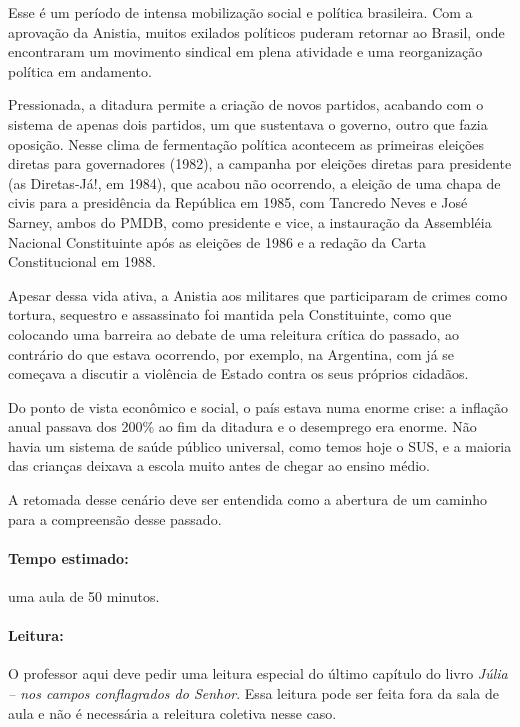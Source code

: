 \documentclass[12pt]{extarticle}
\begin{document}
Esse é um período de intensa mobilização social e política brasileira.
Com a aprovação da Anistia, muitos exilados políticos puderam retornar
ao Brasil, onde encontraram um movimento sindical em plena atividade e
uma reorganização política em andamento.

Pressionada, a ditadura permite a criação de novos partidos, acabando
com o sistema de apenas dois partidos, um que sustentava o governo,
outro que fazia oposição. Nesse clima de fermentação política acontecem
as primeiras eleições diretas para governadores (1982), a campanha por
eleições diretas para presidente (as Diretas-Já!, em 1984), que acabou
não ocorrendo, a eleição de uma chapa de civis para a presidência da
República em 1985, com Tancredo Neves e José Sarney, ambos do PMDB, como
presidente e vice, a instauração da Assembléia Nacional Constituinte
após as eleições de 1986 e a redação da Carta Constitucional em 1988.



Apesar dessa vida ativa, a Anistia aos militares que participaram de
crimes como tortura, sequestro e assassinato foi mantida pela
Constituinte, como que colocando uma barreira ao debate de uma releitura
crítica do passado, ao contrário do que estava ocorrendo, por exemplo,
na Argentina, com já se começava a discutir a violência de Estado contra
os seus próprios cidadãos.



Do ponto de vista econômico e social, o país estava numa enorme crise: a
inflação anual passava dos 200\% ao fim da ditadura e o desemprego era
enorme. Não havia um sistema de saúde público universal, como temos hoje
o SUS, e a maioria das crianças deixava a escola muito antes de chegar
ao ensino médio.

A retomada desse cenário deve ser entendida como a abertura de um
caminho para a compreensão desse passado.

\paragraph{Tempo estimado:} uma aula de 50 minutos.

\paragraph{Leitura:}

O professor aqui deve pedir uma leitura especial do último capítulo do
livro \emph{Júlia -- nos campos conflagrados do Senhor}. Essa leitura
pode ser feita fora da sala de aula e não é necessária a releitura
coletiva nesse caso.
\end{document}
